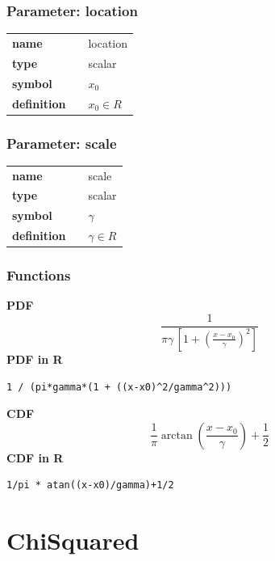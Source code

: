 \documentclass{article}
\begin{document}
\subsubsection*{Parameter: location}

\noindent\begin{tabular}{p{2cm}cl}
\textbf{name} & & location \\
\textbf{type} & & scalar \\
\textbf{symbol} & & $x_0$  \\
\textbf{definition} & & $x_0 \in  R$
\end{tabular}
\subsubsection*{Parameter: scale}

\noindent\begin{tabular}{p{2cm}cl}
\textbf{name} & & scale \\
\textbf{type} & & scalar \\
\textbf{symbol} & & $\gamma$  \\
\textbf{definition} & & $\gamma \in  R$
\end{tabular}
\subsubsection*{Functions}

\smallskip \noindent \hspace{.2cm} \textbf{PDF} 
\begin{equation*}\frac{1}{\pi\gamma\,\left[1 + \left(\frac{x-x_0}{\gamma}\right)^2\right]}\end{equation*}
\smallskip \noindent \hspace{.2cm} \textbf{PDF in R}  
\begin{verbatim}1 / (pi*gamma*(1 + ((x-x0)^2/gamma^2)))\end{verbatim}
\smallskip \noindent \hspace{.2cm} \textbf{CDF} 
\begin{equation*}\frac{1}{\pi} \arctan\left(\frac{x-x_0}{\gamma}\right)+\frac{1}{2}\end{equation*}
\smallskip \noindent \hspace{.2cm} \textbf{CDF in R} 
\begin{verbatim}1/pi * atan((x-x0)/gamma)+1/2\end{verbatim}
\smallskip\section*{ChiSquared} 
\end{document}
